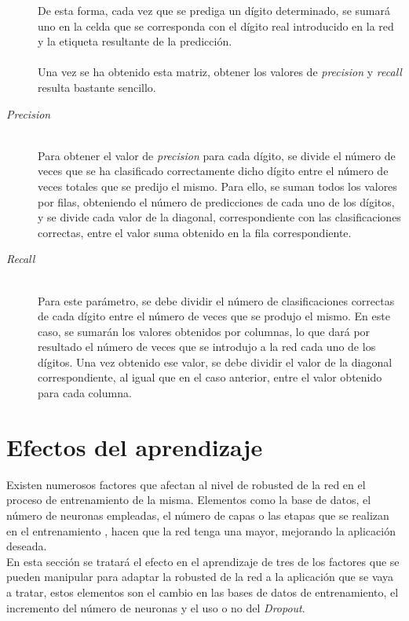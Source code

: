 \begin{description}
	De esta forma, cada vez que se prediga un dígito determinado, se sumará uno en la celda que se corresponda con el dígito real introducido en la red y la etiqueta resultante de la predicción.\\
	\vspace{-10pt}
	\\
	Una vez se ha obtenido esta matriz, obtener los valores de \textit{precision} y \textit{recall} resulta bastante sencillo.
	\vspace{15pt}
	\item[\textit{Precision}] \hfill 
	\vspace{10pt}
	\\
	Para obtener el valor de \textit{precision} para cada dígito, se divide el número de veces que se ha clasificado correctamente dicho dígito entre el número de veces totales que se predijo el mismo. Para ello, se suman todos los valores por filas, obteniendo el número de predicciones de cada uno de los dígitos, y se divide cada valor de la diagonal, correspondiente con las clasificaciones correctas, entre el valor suma obtenido en la fila correspondiente.
	\vspace{15pt}
	\item[\textit{Recall}] \hfill 
	\vspace{10pt}
	\\
	Para este parámetro, se debe dividir el número de clasificaciones correctas de cada dígito entre el número de veces que se produjo el mismo. En este caso, se sumarán los valores obtenidos por columnas, lo que dará por resultado el número de veces que se introdujo a la red cada uno de los dígitos. Una vez obtenido ese valor, se debe dividir el valor de la diagonal correspondiente, al igual que en el caso anterior, entre el valor obtenido para cada columna.
\end{description}

\section{Efectos del aprendizaje}
Existen numerosos factores que afectan al nivel de robusted de la red en el proceso de entrenamiento de la misma. Elementos como la base de datos, el número de neuronas empleadas, el número de capas o las etapas que se realizan en el entrenamiento \cite{lopez2008redes}, hacen que la red tenga una mayor, mejorando la aplicación deseada.\\

En esta sección se tratará el efecto en el aprendizaje de tres de los factores que se pueden manipular para adaptar la robusted de la red a la aplicación que se vaya a tratar, estos elementos son el cambio en las bases de datos de entrenamiento, el incremento del número de neuronas y el uso o no del \textit{Dropout}.\\

